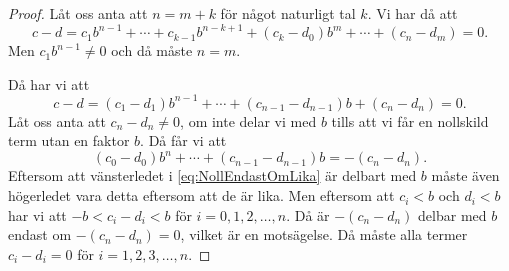 \begin{proof}
  Låt oss anta att \(n=m+k\) för något naturligt tal \(k\).
  Vi har då att
  \begin{equation*}
    c-d=c_1b^{n-1}+\cdots+c_{k-1}b^{n-k+1}+(c_k-d_0)b^m+\cdots+(c_n-d_m) =
    0.
  \end{equation*}
  Men \(c_1b^{n-1}\neq 0\) och då måste \(n=m\).

  Då har vi att
  \begin{equation*}
    c-d = (c_1-d_1)b^{n-1}+\cdots+(c_{n-1}-d_{n-1})b+(c_n-d_n) = 0.
  \end{equation*}
  Låt oss anta att \(c_n-d_n\neq 0\), om inte delar vi med \(b\) tills att vi
  får en nollskild term utan en faktor \(b\).
  Då får vi att
  \begin{equation}
    \label{eq:NollEndastOmLika}
    (c_0-d_0)b^n+\cdots+(c_{n-1}-d_{n-1})b = -(c_n-d_n).
  \end{equation}
  Eftersom att vänsterledet i \cref{eq:NollEndastOmLika} är delbart med
  \(b\) måste även högerledet vara detta eftersom att de är lika.
  Men eftersom att \(c_i<b\) och \(d_i<b\) har vi att
  \(-b<c_i-d_i<b\) för \(i=0,1,2,\ldots,n\).
  Då är \(-(c_n-d_n)\) delbar med \(b\) endast om \(-(c_n-d_n)=0\), vilket
  är en motsägelse.
  Då måste alla termer \(c_i-d_i=0\) för \(i=1,2,3,\ldots,n\).
\end{proof}

